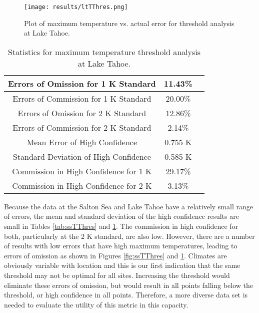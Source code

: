 \documentclass{book}
\begin{document}
\begin{minipage}[c]{0.47\textwidth}
\centering
\begin{figure}[H]
\texttt{[image: results/ltTThres.png]}
\caption{Plot of maximum temperature vs. actual error for threshold analysis at Lake Tahoe.}
\label{fig:ltTThres}
\end{figure}
\end{minipage}
\begin{minipage}[c]{0.47\textwidth}
\begin{table}[H]
\centering
\footnotesize
\begin{tabular}{ | c | c | c | } \hline
Errors of Omission for 1 K Standard & 11.43\% \\ \hline
Errors of Commission for 1 K Standard & 20.00\% \\ \hline
Errors of Omission for 2 K Standard & 12.86\% \\ \hline
Errors of Commission for 2 K Standard & 2.14\% \\ \hline
Mean Error of High Confidence & 0.755 K \\ \hline
Standard Deviation of High Confidence & 0.585 K \\ \hline
Commission in High Confidence for 1 K & 29.17\% \\ \hline
Commission in High Confidence for 2 K & 3.13\% \\ \hline
\end{tabular}
\caption{Statistics for maximum temperature threshold analysis at Lake Tahoe.}
\label{tab:ltTThres}
\end{table}
\end{minipage}

Because the data at the Salton Sea and Lake Tahoe have a relatively small range of errors, the mean and standard deviation of the high confidence results are small in Tables \ref{tab:ssTThres} and \ref{tab:ltTThres}.  The commission in high confidence for both, particularly at the 2 K standard, are also low.  However, there are a number of results with low errors that have high maximum temperatures, leading to errors of omission as shown in Figures \ref{fig:ssTThres} and \ref{fig:ltTThres}.  Climates are obviously variable with location and this is our first indication that the same threshold may not be optimal for all sites.  Increasing the threshold would eliminate these errors of omission, but would result in all points falling below the threshold, or high confidence in all points.  Therefore, a more diverse data set is needed to evaluate the utility of this metric in this capacity.
\end{document}
